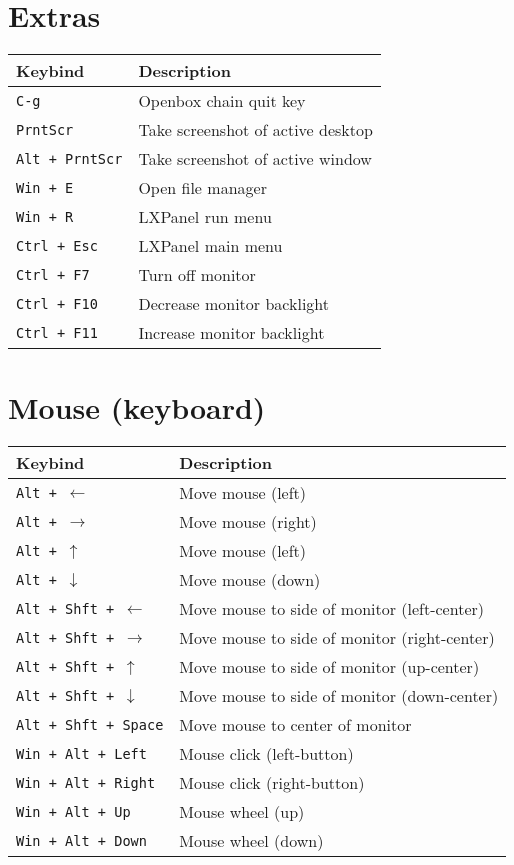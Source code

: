 \documentclass[letterpaper,12pt]{article}
\begin{document}
\section*{Extras}
\begin{table}[H]
  \begin{tabular}{|C{5cm}|L{10cm}|}
    \hline
    \textbf{Keybind} & \textbf{Description} \\
    \hline
    {\tt C-g} & Openbox chain quit key \\
    \hline
    {\tt PrntScr} & Take screenshot of active desktop \\
    {\tt Alt + PrntScr} & Take screenshot of active window \\
    {\tt Win + E} & Open file manager \\ 
    {\tt Win + R} & LXPanel run menu \\ 
    {\tt Ctrl + Esc} & LXPanel main menu \\
    {\tt Ctrl + F7} & Turn off monitor \\
    {\tt Ctrl + F10} & Decrease monitor backlight \\
    {\tt Ctrl + F11} & Increase monitor backlight \\
    \hline
  \end{tabular}
\end{table}

\section*{Mouse (keyboard)}
\begin{table}[H]
  \begin{tabular}{|C{5cm}|L{10cm}|}
    \hline
    \textbf{Keybind} & \textbf{Description} \\
    \hline
    {\tt Alt + $\leftarrow$} & Move mouse (left) \\
    {\tt Alt + $\rightarrow$} & Move mouse (right) \\
    {\tt Alt + $\uparrow$} & Move mouse (left) \\
    {\tt Alt + $\downarrow$} & Move mouse (down) \\
    \hline
    {\tt Alt + Shft + $\leftarrow$} & Move mouse to side of monitor (left-center) \\
    {\tt Alt + Shft + $\rightarrow$} & Move mouse to side of monitor (right-center) \\
    {\tt Alt + Shft + $\uparrow$} & Move mouse to side of monitor (up-center) \\
    {\tt Alt + Shft + $\downarrow$} & Move mouse to side of monitor (down-center) \\
    {\tt Alt + Shft + Space} & Move mouse to center of monitor \\
    \hline
    {\tt Win + Alt + Left} & Mouse click (left-button) \\
    {\tt Win + Alt + Right} & Mouse click (right-button) \\
    {\tt Win + Alt + Up} & Mouse wheel (up) \\
    {\tt Win + Alt + Down} & Mouse wheel (down) \\
    \hline
  \end{tabular}
\end{table}
\end{document}

